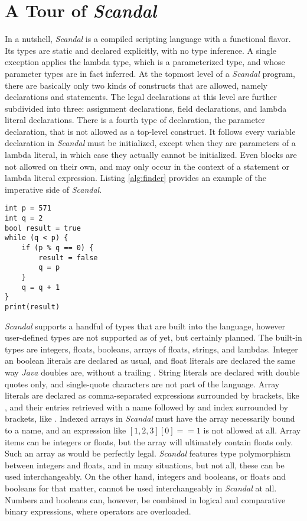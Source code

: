 \section{A Tour of \emph{Scandal}}

In a nutshell, \emph{Scandal} is a compiled scripting language with a functional flavor. Its types are static and declared explicitly, with no type inference. A single exception applies the lambda type, which is a parameterized type, and whose parameter types are in fact inferred. At the topmost level of a \emph{Scandal} program, there are basically only two kinds of constructs that are allowed, namely declarations and statements. The legal declarations at this level are further subdivided into three: assignment declarations, field declarations, and lambda literal declarations. There is a fourth type of declaration, the parameter declaration, that is not allowed as a top-level construct. It follows every variable declaration in \emph{Scandal} must be initialized, except when they are parameters of a lambda literal, in which case they actually cannot be initialized. Even blocks are not allowed on their own, and may only occur in the context of a statement or lambda literal expression. Listing \ref{alg:finder} provides an example of the imperative side of \emph{Scandal}.

\begin{lstlisting}[emph={int,bool,while,if,true,false,print},emphstyle={\textbf},caption={A naive algorithm to determine whether an integer is prime.},label={alg:finder}]
int p = 571
int q = 2
bool result = true
while (q < p) {
	if (p % q == 0) {
		result = false
		q = p
	}
	q = q + 1
}
print(result)
\end{lstlisting}

\emph{Scandal} supports a handful of types that are built into the language, however user-defined types are not supported as of yet, but certainly planned. The built-in types are integers, floats, booleans, arrays of floats, strings, and lambdas. Integer an boolean literals are declared as usual, and float literals are declared the same way \emph{Java} doubles are, without a trailing . String literals are declared with double quotes only, and single-quote characters are not part of the language. Array literals are declared as comma-separated expressions surrounded by brackets, like , and their entries retrieved with a name followed by and index surrounded by brackets, like . Indexed arrays in \emph{Scandal} must have the array necessarily bound to a name, and an expression like $[1, 2, 3][0] == 1$ is not allowed at all. Array items can be integers or floats, but the array will ultimately contain floats only. Such an array as  would be perfectly legal. \emph{Scandal} features type polymorphism between integers and floats, and in many situations, but not all, these can be used interchangeably. On the other hand, integers and booleans, or floats and booleans for that matter, cannot be used interchangeably in \emph{Scandal} at all. Numbers and booleans can, however, be combined in logical and comparative binary expressions, where operators are overloaded.

